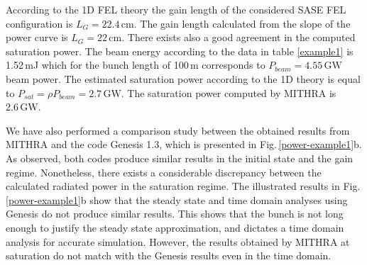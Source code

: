 According to the 1D FEL theory the gain length of the considered SASE FEL configuration is $L_G=22.4\,\mathrm{cm}$.
%
The gain length calculated from the slope of the power curve is $L_G=22\,\mathrm{cm}$.
%
There exists also a good agreement in the computed saturation power.
%
The beam energy according to the data in table \ref{example1} is 1.52\,mJ which for the bunch length of 100\,{\textmu}m corresponds to $P_{beam}=4.55\,\mathrm{GW}$ beam power.
%
The estimated saturation power according to the 1D theory is equal to $P_{sat} = \rho P_{beam} = 2.7\,\mathrm{GW}$.
%
The saturation power computed by MITHRA is $2.6\,\mathrm{GW}$.

We have also performed a comparison study between the obtained results from MITHRA and the code Genesis 1.3, which is presented in Fig.\,\ref{power-example1}b.
%
As observed, both codes produce similar results in the initial state and the gain regime.
%
Nonetheless, there exists a considerable discrepancy between the calculated radiated power in the saturation regime.
%
The illustrated results in Fig.\,\ref{power-example1}b show that the steady state and time domain analyses using Genesis do not produce similar results.
%
This shows that the bunch is not long enough to justify the steady state approximation, and dictates a time domain analysis for accurate simulation.
%
However, the results obtained by MITHRA at saturation do not match with the Genesis results even in the time domain.

